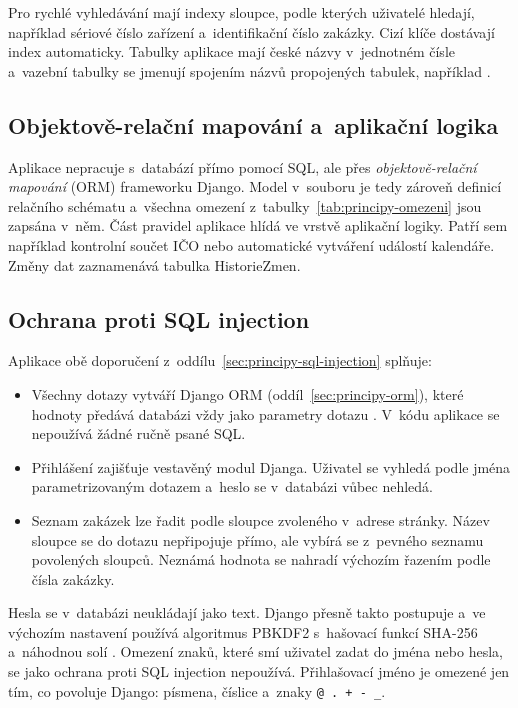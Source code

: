 Pro rychlé vyhledávání mají indexy sloupce, podle kterých uživatelé hledají, například sériové číslo zařízení a~identifikační číslo zakázky. Cizí klíče dostávají index automaticky. Tabulky aplikace mají české názvy v~jednotném čísle a~vazební tabulky se jmenují spojením názvů propojených tabulek, například .

\subsection{Objektově-relační mapování a~aplikační logika}

Aplikace nepracuje s~databází přímo pomocí SQL, ale přes \emph{objektově-relační mapování} (ORM) frameworku Django. Model v~souboru  je tedy zároveň definicí relačního schématu a~všechna omezení z~tabulky~\ref{tab:principy-omezeni} jsou zapsána v~něm. Část pravidel aplikace hlídá ve vrstvě aplikační logiky. Patří sem například kontrolní součet IČO nebo automatické vytváření událostí kalendáře. Změny dat zaznamenává tabulka HistorieZmen.

\subsection{Ochrana proti SQL injection}\label{sec:db-sql-injection}

Aplikace obě doporučení z~oddílu~\ref{sec:principy-sql-injection} splňuje:
\begin{itemize}
\item Všechny dotazy vytváří Django ORM (oddíl~\ref{sec:principy-orm}), které hodnoty předává databázi vždy jako parametry dotazu \cite{django-security}. V~kódu aplikace se nepoužívá žádné ručně psané SQL.
\item Přihlášení zajišťuje vestavěný modul Djanga. Uživatel se vyhledá podle jména parametrizovaným dotazem a~heslo se v~databázi vůbec nehledá.
\item Seznam zakázek lze řadit podle sloupce zvoleného v~adrese stránky. Název sloupce se do dotazu nepřipojuje přímo, ale vybírá se z~pevného seznamu povolených sloupců. Neznámá hodnota se nahradí výchozím řazením podle čísla zakázky.
\end{itemize}

Hesla se v~databázi neukládají jako text. Django přesně takto postupuje a~ve výchozím nastavení používá algoritmus PBKDF2 s~hašovací funkcí SHA-256 a~náhodnou solí \cite{django-hesla}. Omezení znaků, které smí uživatel zadat do jména nebo hesla, se jako ochrana proti SQL injection nepoužívá. Přihlašovací jméno je omezené jen tím, co povoluje Django: písmena, číslice a~znaky \texttt{@~.~+~-~\_}.

